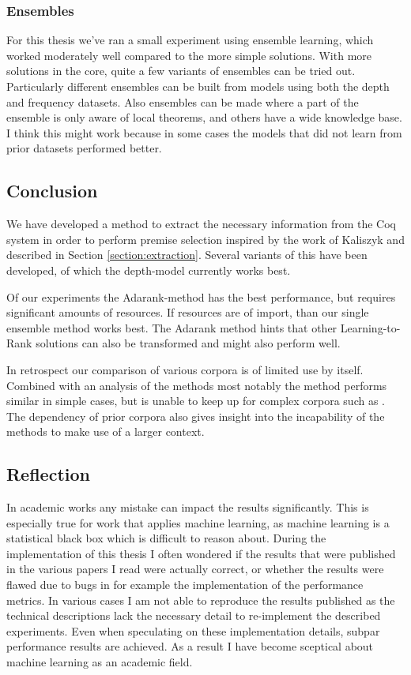 \subsubsection{Ensembles}
For this thesis we've ran a small experiment using ensemble learning, which worked moderately well compared to
the more simple solutions.
With more solutions in the core, quite a few variants of ensembles can be tried out.
Particularly different ensembles can be built from models using both the depth and frequency datasets.
Also ensembles can be made where a part of the ensemble is only aware of local theorems, and others have a wide knowledge base.
I think this might work because in some cases the models that did not learn from prior datasets performed better.

\subsection{Conclusion}
We have developed a method to extract the necessary information from the Coq system in order to perform premise selection
inspired by the work of Kaliszyk and described in Section \ref{section:extraction}.
Several variants of this have been developed, of which the depth-model currently works best.

Of our experiments the Adarank-method has the best performance, but requires significant amounts of resources.
If resources are of import, than our single ensemble method works best.
The Adarank method hints that other Learning-to-Rank solutions can also be transformed and might also perform well.

In retrospect our comparison of various corpora is of limited use by itself.
Combined with an analysis of the methods most notably the \knnadaptive method performs similar in simple cases,
but is unable to keep up for complex corpora such as \corn.
The dependency of prior corpora also gives insight into the incapability of the methods to make use
of a larger context.

\subsection{Reflection}
In academic works any mistake can impact the results significantly.
This is especially true for work that applies machine learning, as machine learning is a statistical black box which
is difficult to reason about.
During the implementation of this thesis I often wondered if the results that were published in the various papers I read
were actually correct, or whether the results were flawed due to bugs in for example the implementation of the
performance metrics.
In various cases I am not able to reproduce the results published as the technical descriptions lack the necessary detail
to re-implement the described experiments.
Even when speculating on these implementation details, subpar performance results are achieved.
As a result I have become sceptical about machine learning as an academic field.

